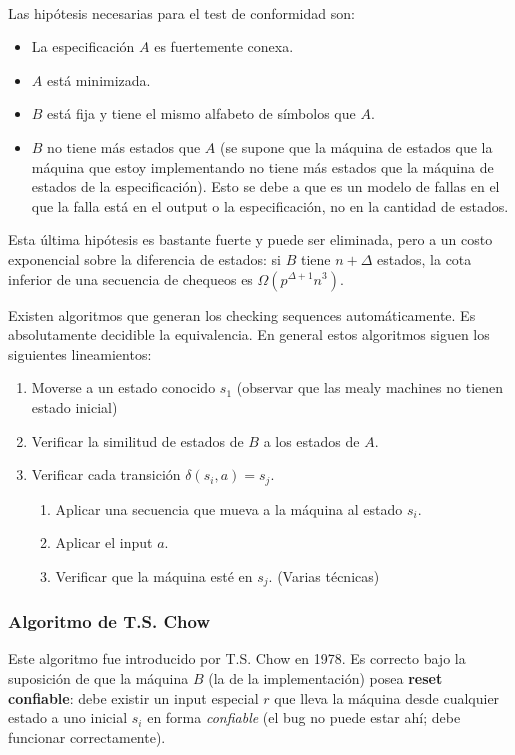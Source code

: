 \documentclass[]{article}
\begin{document}
~\newline

Las hipótesis necesarias para el test de conformidad son:
\begin{itemize}
	\item La especificación $A$ es fuertemente conexa.
	\item $A$ está minimizada.
	\item $B$ está fija y tiene el mismo alfabeto de símbolos que $A$.
	\item $B$ no tiene más estados que $A$ (se supone que la máquina de estados que la máquina que estoy implementando no tiene más estados que la máquina de estados de la especificación). Esto se debe a que es un modelo de fallas en el que la falla está en el output o la especificación, no en la cantidad de estados.
\end{itemize}
Esta última hipótesis es bastante fuerte y puede ser eliminada, pero a un costo exponencial sobre la diferencia de estados: si $B$ tiene $n+\Delta$ estados, la cota inferior de una secuencia de chequeos es $\Omega(p^{\Delta+1}n^3)$.

Existen algoritmos que generan los checking sequences automáticamente. Es absolutamente decidible la equivalencia. En general estos algoritmos siguen los siguientes lineamientos:
\begin{enumerate}
	\item Moverse a un estado conocido $s_1$ (observar que las mealy machines no tienen estado inicial)
	\item Verificar la similitud de estados de $B$ a los estados de $A$.
	\item Verificar cada transición $\delta(s_i,a)=s_j$.
	\begin{enumerate}
		\item Aplicar una secuencia que mueva a la máquina al estado $s_i$.
		\item Aplicar el input $a$.
		\item Verificar que la máquina esté en $s_j$. (Varias técnicas)
	\end{enumerate}
\end{enumerate}

\subsubsection{Algoritmo de T.S. Chow}
Este algoritmo fue introducido por T.S. Chow en 1978. Es correcto bajo la suposición de que la máquina $B$ (la de la implementación) posea \textbf{reset confiable}: debe existir un input especial $r$ que lleva la máquina desde cualquier estado a uno inicial $s_i$ en forma \textit{confiable} (el bug no puede estar ahí; debe funcionar correctamente).
\end{document}

